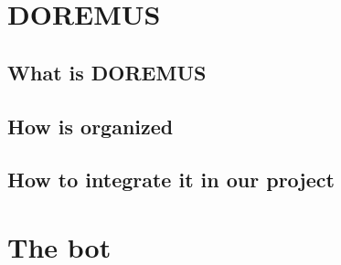 \documentclass[a4paper,12pt]{report}
\begin{document}
\chapter{DOREMUS}
	\section{What is DOREMUS}
	\section{How is organized}
	\section{How to integrate it in our project}

\chapter{The bot}
\end{document}
